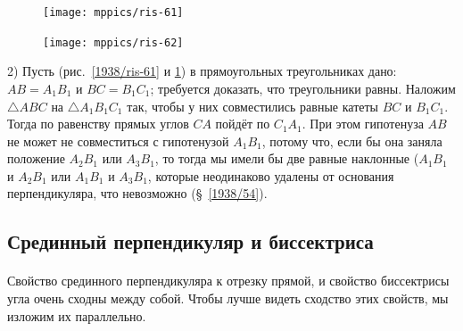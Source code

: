 \documentclass[oneside]{book}
\begin{document}
\begin{figure}[h!]
\begin{minipage}{.48\textwidth}
\centering
\texttt{[image: mppics/ris-61]}
\caption{}\label{1938/ris-61}
\end{minipage}\hfill
\begin{minipage}{.48\textwidth}
\centering
\texttt{[image: mppics/ris-62]}
\caption{}\label{1938/ris-62}
\end{minipage}
\end{figure}

2) Пусть (рис.~\ref{1938/ris-61} и \ref{1938/ris-62}) в прямоугольных треугольниках дано:
$AB=A_1B_1$ и $BC=B_1C_1$;
требуется доказать, что треугольники равны.
Наложим $\triangle ABC$ на $\triangle A_1B_1C_1$ так, чтобы у них совместились равные катеты $BC$ и $B_1C_1$.
Тогда по равенству прямых углов $CA$ пойдёт по $C_1A_1$.
При этом гипотенуза $AB$ не может не совместиться с гипотенузой $A_1B_1$, потому что, если бы она заняла положение $A_2B_1$ или $A_3B_1$, то тогда мы имели бы две равные наклонные ($A_1B_1$ и $A_2B_1$ или $A_1B_1$ и $A_3B_1$, которые неодинаково удалены от основания перпендикуляра, что невозможно (§~\ref{1938/54}).

\subsection*{Срединный перпендикуляр и биссектриса} 

\paragraph{}\label{1938/58}
Свойство срединного перпендикуляра к отрезку прямой, и свойство биссектрисы угла очень сходны между собой.
Чтобы лучше видеть сходство этих свойств, мы изложим их параллельно.
\end{document}
